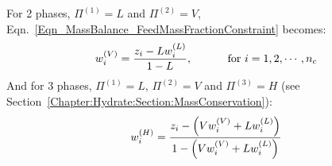 \begin{shaded}\noindent
   For 2 phases, $\Pi^{(1)}=L$ and $\Pi^{(2)}=V$, Eqn.~\ref{Eqn_MassBalance_FeedMassFractionConstraint} becomes:
     \begin{displaymath}
      \mfr[w]{i}{V} = \frc{z_{i}-L\mfr[w]{i}{L}}{1-L}, \hspace{1cm}\text{ for } i=1,2,\cdots,n_{c}
     \end{displaymath}
     And for 3 phases, $\Pi^{(1)}=L$, $\Pi^{(2)}=V$ and $\Pi^{(3)}=H$ (see Section~\ref{Chapter:Hydrate:Section:MassConservation}):
        \begin{displaymath}
           \mfr[w]{i}{H} = \frc{z_{i}-\left(V \mfr[w]{i}{V} + L \mfr[w]{i}{L}\right)}{1 - \left(V \mfr[w]{i}{V} + L \mfr[w]{i}{L}\right)}
        \end{displaymath}
\end{shaded}

